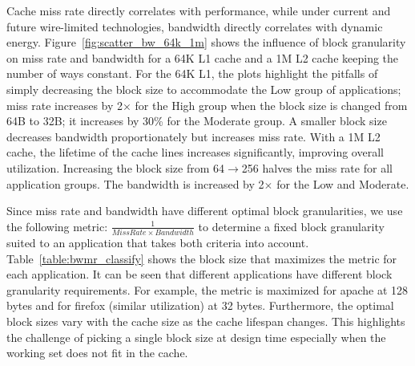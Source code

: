 Cache miss rate directly correlates with performance, while under
current and future wire-limited technologies, bandwidth
directly correlates with dynamic energy.
Figure~\ref{fig:scatter_bw_64k_1m} shows the influence of block
granularity on miss rate and bandwidth for a 64K L1 cache and a 1M L2
cache keeping the number of ways constant. For the 64K L1, the plots
highlight the pitfalls of simply decreasing the block size to
accommodate the Low group of applications; miss rate increases by
2$\times$ for the High group when the block size is changed from 64B
to 32B; it increases by 30\% for the Moderate group. A smaller block
size decreases bandwidth proportionately but increases miss rate. With
a 1M L2 cache, the lifetime of the cache lines increases significantly, 
improving overall utilization. Increasing the block size from
64$\to$256 halves the miss rate for all application groups. 
The bandwidth is increased by 2$\times$ for the Low and Moderate.


Since miss rate and bandwidth have different optimal block
granularities, we use the following metric: $\frac{1}{Miss Rate \times
  Bandwidth}$ to determine a fixed block granularity suited to an
application that takes both criteria into account.
Table~\ref{table:bwmr_classify} shows the block size that maximizes
the metric for each application.  It can be seen that different
applications have different block granularity requirements.  For
example, the metric is maximized for apache at 128 bytes and for
firefox (similar utilization) at 32 bytes.  Furthermore, the optimal
block sizes vary with the cache size as the cache lifespan
changes. This highlights the challenge of picking a single block size
at design time especially when the working set does not fit in the
cache.


